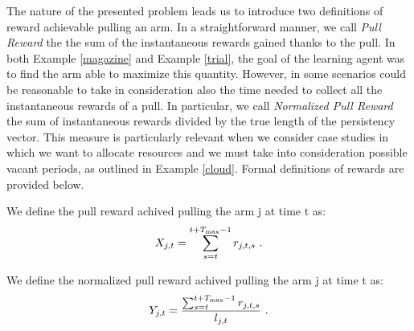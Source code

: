 The nature of the presented problem leads us to introduce two definitions of reward achievable pulling an arm. In a straightforward manner, we call \emph{Pull Reward} the the sum of the instantaneous rewards gained thanks to the pull. In both Example \ref{magazine} and Example \ref{trial}, the goal of the learning agent was to find the arm able to maximize this quantity. However, in some scenarios could be reasonable to take in consideration also the time needed to collect all the instantaneous rewards of a pull. In particular, we call \emph{Normalized Pull Reward} the sum of instantaneous rewards divided by the true length of the persistency vector.
This measure is particularly relevant when we consider case studies in which we want to allocate resources and we must take into consideration possible vacant periods, as outlined in Example \ref{cloud}.
Formal definitions of rewards are provided below.


\begin{definition}
	We define the pull reward achived pulling the arm j at time t as:
		$$X_{j,t} = \sum_{s=t}^{t+T_{\textnormal{max}}-1} r_{j,t,s} \ .$$
\end{definition}

\begin{definition}
	We define the normalized pull reward achived pulling the arm j at time t as:
		$$Y_{j,t} = \dfrac{\sum_{s=t}^{t+T_{\textnormal{max}}-1} r_{j,t,s}}{l_{j,t}} \ .$$
\end{definition}

